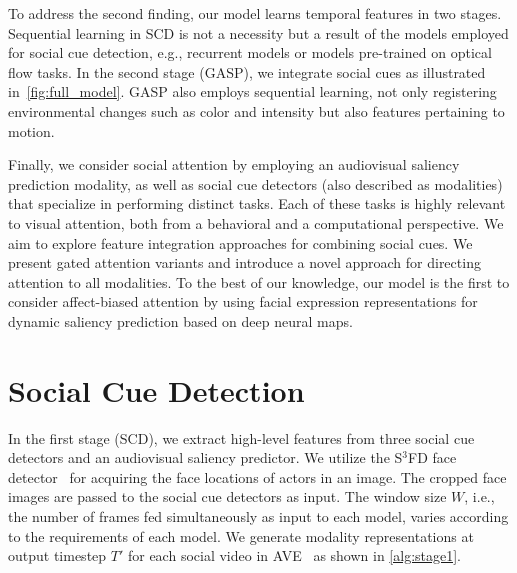 \documentclass{article}
\begin{document}
To address the second finding, our model learns temporal features in two stages. Sequential learning in SCD is not a necessity but a result of the models employed for social cue detection, e.g., recurrent models or models pre-trained on optical flow tasks. In the second stage (GASP), we integrate social cues as illustrated in~\autoref{fig:full_model}. GASP also employs sequential learning, not only registering environmental changes such as color and intensity but also features pertaining to motion.  

Finally, we consider social attention by employing an audiovisual saliency prediction modality, as well as social cue detectors (also described as modalities) that specialize in performing distinct tasks. Each of these tasks is highly relevant to visual attention, both from a behavioral and a computational perspective. 
We aim to explore feature integration approaches for combining social cues. We present gated attention variants and introduce a novel approach for directing attention to all modalities. To the best of our knowledge, our model is the first to consider affect-biased attention by using facial expression representations for dynamic saliency prediction based on deep neural maps.

\section{Social Cue Detection}
\label{sec:stage1}
In the first stage (SCD), we extract high-level features from three social cue detectors and an audiovisual saliency predictor. We utilize the S$^{\text{3}}$FD face detector~\cite{zhang2017sfd} for acquiring the face locations of actors in an image. The cropped face images are passed to the social cue detectors as input. The window size $W$, i.e., the number of frames fed simultaneously as input to each model, varies according to the requirements of each model. We generate modality representations at output timestep $T'$ for each social video in AVE~\cite{tavakoli2020deep} as shown in \autoref{alg:stage1}.
\end{document}
